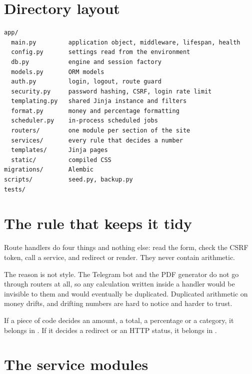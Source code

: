 \section{Directory layout}

\begin{lstlisting}[style=sh]
app/
  main.py         application object, middleware, lifespan, health
  config.py       settings read from the environment
  db.py           engine and session factory
  models.py       ORM models
  auth.py         login, logout, route guard
  security.py     password hashing, CSRF, login rate limit
  templating.py   shared Jinja instance and filters
  format.py       money and percentage formatting
  scheduler.py    in-process scheduled jobs
  routers/        one module per section of the site
  services/       every rule that decides a number
  templates/      Jinja pages
  static/         compiled CSS
migrations/       Alembic
scripts/          seed.py, backup.py
tests/
\end{lstlisting}

\section{The rule that keeps it tidy}

Route handlers do four things and nothing else: read the form, check the CSRF
token, call a service, and redirect or render. They never contain arithmetic.

The reason is not style. The Telegram bot and the PDF generator do not go
through routers at all, so any calculation written inside a handler would be
invisible to them and would eventually be duplicated. Duplicated arithmetic on
money drifts, and drifting numbers are hard to notice and harder to trust.

\begin{keypoint}
If a piece of code decides an amount, a total, a percentage or a category, it
belongs in . If it decides a redirect or an HTTP status, it
belongs in .
\end{keypoint}

\section{The service modules}

